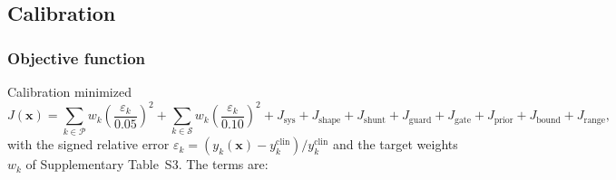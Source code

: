 \documentclass{article}
\begin{document}
\FloatBarrier
\subsection{Calibration}
\label{sec:calibration}

\subsubsection{Objective function}
Calibration minimized
\begin{equation}
J(\mathbf{x}) = \sum_{k \in \mathcal{P}} w_k\left(\frac{\varepsilon_k}{0.05}\right)^{2}
+ \sum_{k \in \mathcal{S}} w_k\left(\frac{\varepsilon_k}{0.10}\right)^{2}
+ J_{\mathrm{sys}} + J_{\mathrm{shape}} + J_{\mathrm{shunt}} + J_{\mathrm{guard}}
+ J_{\mathrm{gate}} + J_{\mathrm{prior}} + J_{\mathrm{bound}} + J_{\mathrm{range}},
\label{eq:objective}
\end{equation}
with the signed relative error $\varepsilon_k = (y_k(\mathbf{x}) - y_k^{\mathrm{clin}})/y_k^{\mathrm{clin}}$ and the target weights $w_k$ of Supplementary Table~S3. The terms are:
\end{document}
